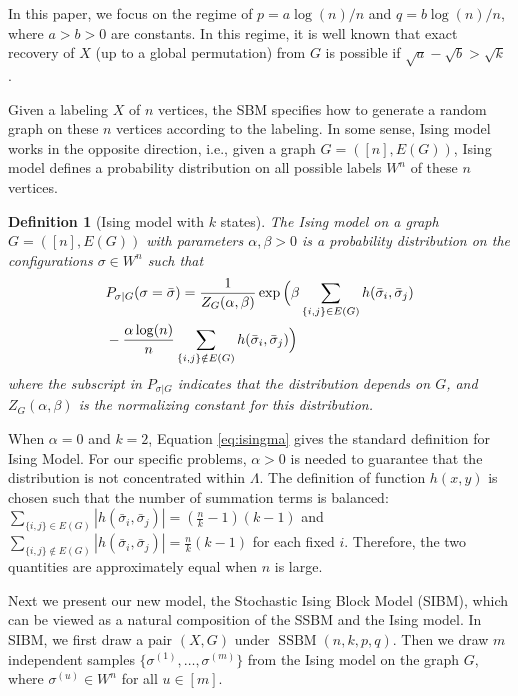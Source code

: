 \label{key}\documentclass[conference]{IEEEtran}
\newtheorem{definition}{Definition}%
\DeclareMathOperator{\SSBM}{SSBM}
\begin{document}
In this paper, we focus on the regime of $p=a\log(n)/n$ and $q=b\log(n)/n$, where $a>b> 0$ are constants. In this regime, it is well known that exact recovery of $X$ (up to a global permutation) from $G$ is possible if $\sqrt{a}-\sqrt{b} > \sqrt{k}$ \cite{abbe2015exact}.
 
Given a labeling $X$ of $n$ vertices, the SBM specifies how to generate a random graph on these $n$ vertices according to the labeling. In some sense, Ising model works in the opposite direction, i.e., given a graph $G=([n],E(G))$, Ising model defines a probability distribution on all possible labels $W^n$ of these $n$ vertices. 

 
\begin{definition}[Ising model with $k$ states]
The Ising model on a graph $G=([n],E(G))$ with parameters $\alpha,\beta>0$ is a probability distribution on the configurations $\sigma\in W^n$ such that
\begin{align} \label{eq:isingma}
&P_{\sigma|G}(\sigma=\bar{\sigma})=\frac{1}{Z_G(\alpha,\beta)}
\exp\Big(\beta \sum_{\{i,j\}\in E(G)} h(\bar{\sigma}_i, \bar{\sigma}_j)\notag\\
&-\frac{\alpha\log(n)}{n} \sum_{\{i,j\}\notin E(G)} h(\bar{\sigma}_i, \bar{\sigma}_j)\Big)
\end{align}
where the subscript in $P_{\sigma|G}$ indicates that the distribution depends on $G$, and
$Z_G(\alpha,\beta)$ is the normalizing constant for this distribution.
\end{definition}

When $\alpha=0$ and $k=2$, Equation \eqref{eq:isingma} gives the standard definition for Ising Model.
For our specific problems, $\alpha > 0$ is needed to guarantee that the distribution is not concentrated within
$\Lambda$. The definition of function $h(x, y)$ is chosen such that the number of summation terms is balanced: $\sum_{\{i,j\}\in E(G)} | h(\bar{\sigma}_i, \bar{\sigma}_j) | = (\frac{n}{k} - 1)(k-1)$ and $\sum_{\{i,j\}\not\in E(G)} | h(\bar{\sigma}_i, \bar{\sigma}_j)| = \frac{n}{k} (k-1)$ for each fixed $i$. Therefore, the two
quantities are approximately equal when $n$ is large.

Next we present our new model, the Stochastic Ising Block Model (SIBM), which can be viewed as a natural composition of the SSBM and the Ising model. In SIBM, we first draw a pair $(X,G)$ under $\SSBM(n,k,p,q)$.  Then we draw $m$ independent samples $\{\sigma^{(1)},\dots,\sigma^{(m)}\}$ from the Ising model on the graph $G$, where $\sigma^{(u)}\in W^n$ for all $u\in[m]$.
\end{document}
